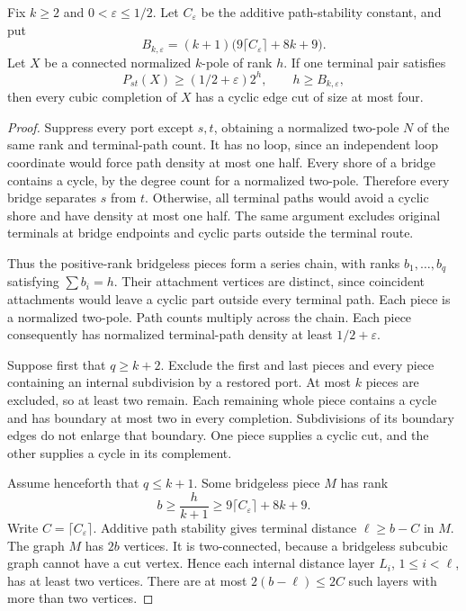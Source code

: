 \begin{theorem}
\label{thm:high-density-pair-small-cyclic-cut}
Fix $k\ge2$ and $0<\varepsilon\le1/2$.
Let $C_\varepsilon$ be the additive path-stability constant, and put
\[
 B_{k,\varepsilon}
 =(k+1)\bigl(9\lceil C_\varepsilon\rceil+8k+9\bigr).
\]
Let $X$ be a connected normalized $k$-pole of rank $h$.
If one terminal pair satisfies
\[
 P_{st}(X)\ge(1/2+\varepsilon)2^h,
 \qquad h\ge B_{k,\varepsilon},
\]
then every cubic completion of $X$ has a cyclic edge cut of size at most four.
\end{theorem}

\begin{proof}
Suppress every port except $s,t$, obtaining a normalized two-pole $N$ of the same rank and terminal-path count.
It has no loop, since an independent loop coordinate would force path density at most one half.
Every shore of a bridge contains a cycle, by the degree count for a normalized two-pole.
Therefore every bridge separates $s$ from $t$.
Otherwise, all terminal paths would avoid a cyclic shore and have density at most one half.
The same argument excludes original terminals at bridge endpoints and cyclic parts outside the terminal route.

Thus the positive-rank bridgeless pieces form a series chain, with ranks $b_1,\ldots,b_q$ satisfying $\sum b_i=h$.
Their attachment vertices are distinct, since coincident attachments would leave a cyclic part outside every terminal path.
Each piece is a normalized two-pole.
Path counts multiply across the chain.
Each piece consequently has normalized terminal-path density at least $1/2+\varepsilon$.

Suppose first that $q\ge k+2$.
Exclude the first and last pieces and every piece containing an internal subdivision by a restored port.
At most $k$ pieces are excluded, so at least two remain.
Each remaining whole piece contains a cycle and has boundary at most two in every completion.
Subdivisions of its boundary edges do not enlarge that boundary.
One piece supplies a cyclic cut, and the other supplies a cycle in its complement.

Assume henceforth that $q\le k+1$.
Some bridgeless piece $M$ has rank
\[
 b\ge\frac h{k+1}\ge9\lceil C_\varepsilon\rceil+8k+9.
\]
Write $C=\lceil C_\varepsilon\rceil$.
Additive path stability gives terminal distance $\ell\ge b-C$ in $M$.
The graph $M$ has $2b$ vertices.
It is two-connected, because a bridgeless subcubic graph cannot have a cut vertex.
Hence each internal distance layer $L_i$, $1\le i<\ell$, has at least two vertices.
There are at most $2(b-\ell)\le2C$ such layers with more than two vertices.


\end{proof}

